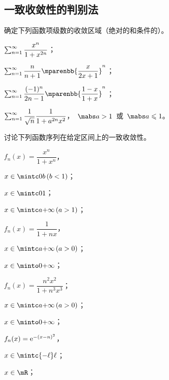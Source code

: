 \subsection{一致收敛性的判别法}
\begin{exercise}
\item 确定下列函数项级数的收敛区域（绝对的和条件的）。
\begin{exlistcols}
  \item $\sum_{n=1}^\infty\dfrac{x^n}{1+x^{2n}}$；
  \item $\sum_{n=1}^\sinf\dfrac n{n+1}\mparenbb{\dfrac x{2x+1}}^n$；
  \item $\sum_{n=1}^\sinf\dfrac{(-1)^n}{2n-1}\mparenbb{\dfrac{1-x}{1+x}}^n$；
  \item $\sum_{n=1}^\infty\dfrac1{\sqrt n}\dfrac1{1+a^{2n}x^2}$，~$\mabs a>1$~或~$\mabs a\leq 1$。
\end{exlistcols}
\item 讨论下列函数序列在给定区间上的一致收敛性。
\begin{exlist}
  \item $f_n(x)=\dfrac{x^n}{1+x^n}$，
  \begin{enumerate*}[D,inline]
    \item $x\in\mintc0b\mcond{b<1}$；
    \item $x\in\mintc01$；
    \item $x\in\mintc a\pinf\mcond{a>1}$；
  \end{enumerate*}
  \item $f_n(x)=\dfrac1{1+nx}$，
  \begin{enumerate*}[D,inline]
    \item $x\in\mintc a\pinf\mcond{a>0}$；
    \item $x\in\minto0\pinf$；
  \end{enumerate*}
  \item $f_n(x)=\dfrac{n^2x^2}{1+n^3x^3}$；
  \begin{enumerate*}[D,inline]
    \item $x\in\mintc a\pinf\mcond{a>0}$；
    \item $x\in\minto0\pinf$；
  \end{enumerate*}
  \item $f_n(x)=\mathrm e^{-(x-n)^2}$，
  \begin{enumerate*}[D,inline]
    \item $x\in\mintc{-\ell}\ell$；
    \item $x\in\mR$；
  \end{enumerate*}
\begin{exlistcols*}

\end{exlistcols*}
\end{exlist}
\end{exercise}
